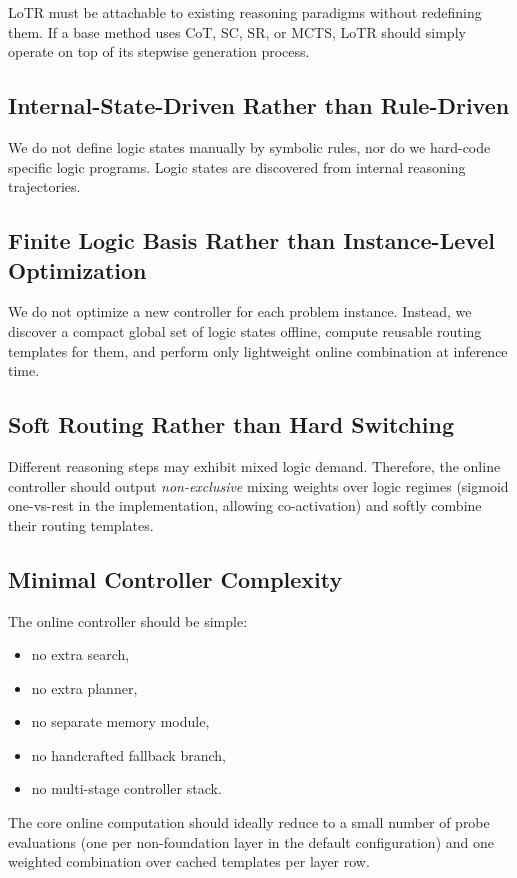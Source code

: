 \documentclass[11pt]{article}
\begin{document}
LoTR must be attachable to existing reasoning paradigms without redefining them. If a base method uses CoT, SC, SR, or MCTS, LoTR should simply operate on top of its stepwise generation process.

\subsection{Internal-State-Driven Rather than Rule-Driven}

We do not define logic states manually by symbolic rules, nor do we hard-code specific logic programs. Logic states are discovered from internal reasoning trajectories.

\subsection{Finite Logic Basis Rather than Instance-Level Optimization}

We do not optimize a new controller for each problem instance. Instead, we discover a compact global set of logic states offline, compute reusable routing templates for them, and perform only lightweight online combination at inference time.

\subsection{Soft Routing Rather than Hard Switching}

Different reasoning steps may exhibit mixed logic demand. Therefore, the online controller should output \emph{non-exclusive} mixing weights over logic regimes (sigmoid one-vs-rest in the implementation, allowing co-activation) and softly combine their routing templates.

\subsection{Minimal Controller Complexity}

The online controller should be simple:
\begin{itemize}[leftmargin=1.5em]
    \item no extra search,
    \item no extra planner,
    \item no separate memory module,
    \item no handcrafted fallback branch,
    \item no multi-stage controller stack.
\end{itemize}
The core online computation should ideally reduce to a small number of probe evaluations (one per non-foundation layer in the default configuration) and one weighted combination over cached templates per layer row.
\end{document}
